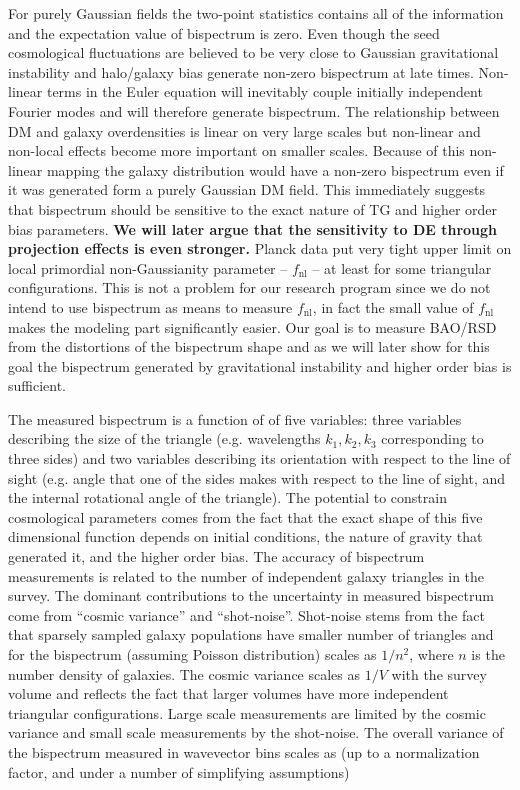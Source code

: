 For purely Gaussian fields the two-point statistics contains all of the
information and the expectation value of bispectrum is zero.  Even though the seed
cosmological fluctuations are believed to be very close to Gaussian
gravitational instability and halo/galaxy bias generate non-zero bispectrum at
late times. Non-linear terms in the Euler equation will inevitably
couple initially independent Fourier modes and will therefore generate
bispectrum. The relationship between DM and galaxy overdensities  is linear
on very large scales but non-linear and non-local effects become more important
on smaller scales. Because of this non-linear mapping the galaxy distribution
would have a non-zero bispectrum even if it was generated form a purely
Gaussian DM field. This immediately suggests that bispectrum should be
sensitive to the exact nature of TG and higher order bias parameters.
\textbf{We will later argue that the sensitivity to DE  through projection
effects is even stronger.} Planck data put very tight upper limit on local
primordial non-Gaussianity parameter -- $f_\mathrm{nl}$ -- at least for some
triangular configurations. This is not a problem for our research program since
we do not intend to use bispectrum as means to measure $f_\mathrm{nl}$, in fact
the small value of $f_\mathrm{nl}$ makes the modeling part significantly
easier. Our goal is to measure BAO/RSD from the distortions of the bispectrum
shape and as we will later show for this goal the bispectrum generated by
gravitational instability and higher order bias is sufficient.

The measured bispectrum is a function of of five variables: three variables describing the size of the triangle (e.g.
wavelengths $k_1, k_2, k_3$ corresponding to three sides) and two variables
describing its orientation with respect to the line of sight (e.g. angle that
one of the sides makes with respect to the line of sight, and the internal
rotational angle of the triangle). The potential to constrain cosmological
parameters comes from the fact that the exact shape of this  five dimensional
function depends on initial conditions, the nature of gravity that generated
it, and the higher order bias. The accuracy of bispectrum measurements is
related to the number of independent galaxy triangles in the survey. The
dominant contributions to the uncertainty in measured bispectrum come from
``cosmic variance'' and ``shot-noise''. Shot-noise stems from the fact that
sparsely sampled galaxy populations have smaller number of triangles and for
the bispectrum (assuming Poisson distribution) scales as  $1/n^2$, where $n$ is
the number density of galaxies. The cosmic variance scales as $1/V$ with the
survey volume and reflects the fact that larger volumes have more independent
triangular configurations. Large scale measurements are limited by the cosmic
variance and small scale measurements by the shot-noise. The overall variance
of the bispectrum measured in wavevector bins scales as (up to a normalization
factor, and under a number of simplifying assumptions)  

